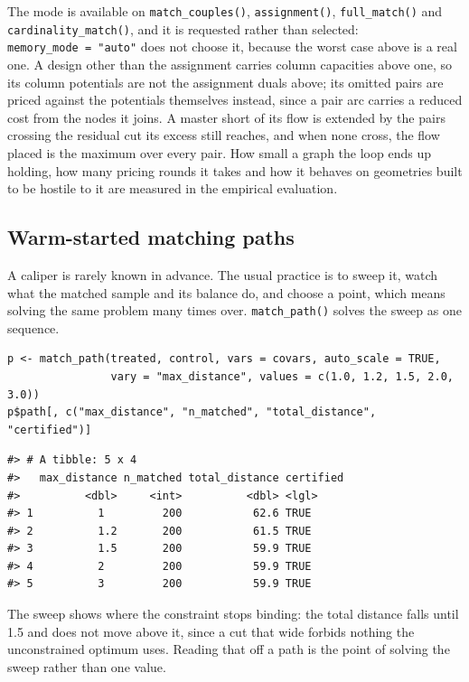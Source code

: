 The mode is available on \texttt{match\_couples()}, \texttt{assignment()}, \texttt{full\_match()} and
\texttt{cardinality\_match()}, and it is requested rather than selected:
\texttt{memory\_mode\ =\ "auto"} does not choose it, because the worst case above is a
real one. A design other than the assignment carries column capacities above
one, so its column potentials are not the assignment duals above; its omitted
pairs are priced against the potentials themselves instead, since a pair arc
carries a reduced cost from the nodes it joins. A master short of its flow is
extended by the pairs crossing the residual cut its excess still reaches, and
when none cross, the flow placed is the maximum over every pair. How small a graph the loop
ends up holding, how many pricing rounds it takes and how it behaves on
geometries built to be hostile to it are measured in the empirical
evaluation.

\subsection{Warm-started matching paths}\label{warm-started-matching-paths}

A caliper is rarely known in advance. The usual practice is to sweep it, watch
what the matched sample and its balance do, and choose a point, which means
solving the same problem many times over. \texttt{match\_path()} solves the sweep as
one sequence.

\begin{verbatim}
p <- match_path(treated, control, vars = covars, auto_scale = TRUE,
                vary = "max_distance", values = c(1.0, 1.2, 1.5, 2.0, 3.0))
p$path[, c("max_distance", "n_matched", "total_distance", "certified")]
\end{verbatim}

\begin{verbatim}
#> # A tibble: 5 x 4
#>   max_distance n_matched total_distance certified
#>          <dbl>     <int>          <dbl> <lgl>    
#> 1          1         200           62.6 TRUE     
#> 2          1.2       200           61.5 TRUE     
#> 3          1.5       200           59.9 TRUE     
#> 4          2         200           59.9 TRUE     
#> 5          3         200           59.9 TRUE
\end{verbatim}

The sweep shows where the constraint stops binding: the total distance falls
until 1.5 and does not move above it, since a cut that wide forbids nothing
the unconstrained optimum uses. Reading that off a path is the point of
solving the sweep rather than one value.

